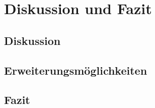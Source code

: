
\chapter{Diskussion und Fazit}
\label{chap:discussion_and_conclusion}

\section{Diskussion}
\label{sec:discussion}

\section{Erweiterungsmöglichkeiten}
\label{sec:further_work}

\section{Fazit}
\label{sec:fazit}

